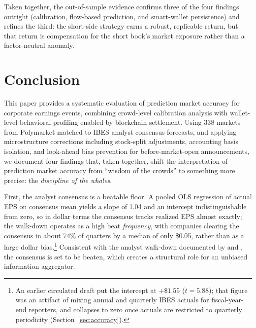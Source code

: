 \documentclass[11pt]{article}
\begin{document}
Taken together, the out-of-sample evidence confirms three of the four findings outright (calibration, flow-based prediction, and smart-wallet persistence) and refines the third: the short-side strategy earns a robust, replicable return, but that return is compensation for the short book's market exposure rather than a factor-neutral anomaly.

\section{Conclusion} \label{sec:conclusion}

This paper provides a systematic evaluation of prediction market accuracy for corporate earnings events, combining crowd-level calibration analysis with wallet-level behavioral profiling enabled by blockchain settlement. Using 338 markets from Polymarket matched to IBES analyst consensus forecasts, and applying microstructure corrections including stock-split adjustments, accounting basis isolation, and look-ahead bias prevention for before-market-open announcements, we document four findings that, taken together, shift the interpretation of prediction market accuracy from ``wisdom of the crowds'' to something more precise: the \textit{discipline of the whales}.

First, the analyst consensus is a beatable floor. A pooled OLS regression of actual EPS on consensus mean yields a slope of 1.04 and an intercept indistinguishable from zero, so in dollar terms the consensus tracks realized EPS almost exactly; the walk-down operates as a high beat \textit{frequency}, with companies clearing the consensus in about 74\% of quarters by a median of only \$0.05, rather than as a large dollar bias.\footnote{An earlier circulated draft put the intercept at $+\$1.55$ ($t = 5.88$); that figure was an artifact of mixing annual and quarterly IBES actuals for fiscal-year-end reporters, and collapses to zero once actuals are restricted to quarterly periodicity (Section~\ref{sec:accuracy}).} Consistent with the analyst walk-down documented by \citet{richardson2004walk} and \citet{matsumoto2002management}, the consensus is set to be beaten, which creates a structural role for an unbiased information aggregator.
\end{document}
